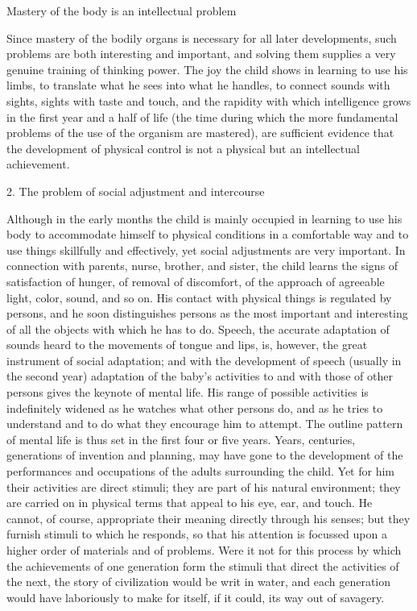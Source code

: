 \documentclass[letterpaper]{book}
\begin{document}
Mastery of the body is an intellectual problem

Since mastery of the bodily organs is necessary for all later
developments, such problems are both interesting and important, and
solving them supplies a very genuine training of thinking power. The joy
the child shows in learning to use his limbs, to translate what he sees
into what he handles, to connect sounds with sights, sights with taste
and touch, and the rapidity with which intelligence grows in the first
year and a half of life (the time during which the more fundamental
problems of the use of the organism are mastered), are sufficient
evidence that the development of physical control is not a physical but
an intellectual achievement.

2. The problem of social adjustment and intercourse

Although in the early months the child is mainly
occupied
in learning to use his body to accommodate himself to physical
conditions in a comfortable way and to use things skillfully and
effectively, yet social adjustments are very important. In connection
with parents, nurse, brother, and sister, the child learns the signs of
satisfaction of hunger, of removal of discomfort, of the approach of
agreeable light, color, sound, and so on. His contact with physical
things is regulated by persons, and he soon distinguishes persons as the
most important and interesting of all the objects with which he has to
do. Speech, the accurate adaptation of sounds heard to the movements of
tongue and lips, is, however, the great instrument of social adaptation;
and with the development of speech (usually in the second year)
adaptation of the baby's activities to and with those of other persons
gives the keynote of mental life. His range of possible activities is
indefinitely widened as he watches what other persons do, and as he
tries to understand and to do what they encourage him to attempt. The
outline pattern of mental life is thus set in the first four or five
years. Years, centuries, generations of invention and planning, may have
gone to the development of the performances and occupations of the
adults surrounding the child. Yet for him their activities are direct
stimuli; they are part of his natural environment; they are carried on
in physical terms that appeal to his eye, ear, and touch. He cannot, of
course, appropriate their meaning directly through his senses; but they
furnish stimuli to which he responds, so that his attention is focussed
upon a higher order of materials and of problems. Were it not for this
process by which the achievements of one generation form the stimuli
that direct the activities of the next, the story of
civilization
would be writ in water, and each generation would have laboriously to
make for itself, if it could, its way out of savagery.
\end{document}
